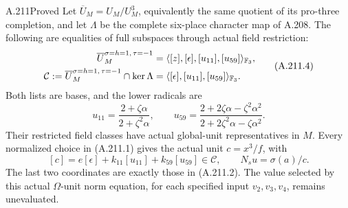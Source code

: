 \begin{statement}{A.211}{Proved}
Let \(\overline U_M=U_M/U_M^3\), equivalently the same quotient
of its pro-three completion, and let \(\Lambda\) be the complete
six-place character map of A.208.  The following are equalities
of full subspaces through actual field restriction:
\[
\begin{aligned}
 \overline U_M^{\sigma=h=1,\,\tau=-1}
   &=\langle[z],[\epsilon],[u_{11}],[u_{59}]\rangle_{\mathbb F_3},\\
 \mathcal C:=
 \overline U_M^{\sigma=h=1,\,\tau=-1}\cap\ker\Lambda
   &=\langle[\epsilon],[u_{11}],[u_{59}]\rangle_{\mathbb F_3}.
\end{aligned}
\tag{A.211.4}
\]
Both lists are bases, and the lower radicals are
\[
 u_{11}=\frac{2+\zeta\alpha}{2+\zeta^2\alpha},\qquad
 u_{59}=
 \frac{2+2\zeta\alpha-\zeta^2\alpha^2}
      {2+2\zeta^2\alpha-\zeta\alpha^2}.
\tag{A.211.5}
\]
Their restricted field classes have actual global-unit
representatives in \(M\).  Every normalized choice in (A.211.1)
gives the actual unit \(c=x^3/f\), with
\[
 [c]=e[\epsilon]+k_{11}[u_{11}]+k_{59}[u_{59}]\in\mathcal C,
 \qquad N_su=\sigma(a)/c.
\tag{A.211.6}
\]
The last two coordinates are exactly those in (A.211.2).
The value selected by this actual \(\Omega\)-unit norm equation,
for each specified input \(v_2,v_3,v_4\), remains unevaluated.
\end{statement}

